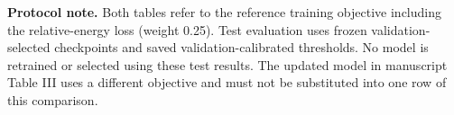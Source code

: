 \documentclass[10pt]{article}
\begin{document}
\noindent\textbf{Protocol note.} Both tables refer to the reference training objective including the relative-energy loss (weight 0.25). Test evaluation uses frozen validation-selected checkpoints and saved validation-calibrated thresholds. No model is retrained or selected using these test results. The updated model in manuscript Table III uses a different objective and must not be substituted into one row of this comparison.
\end{document}
